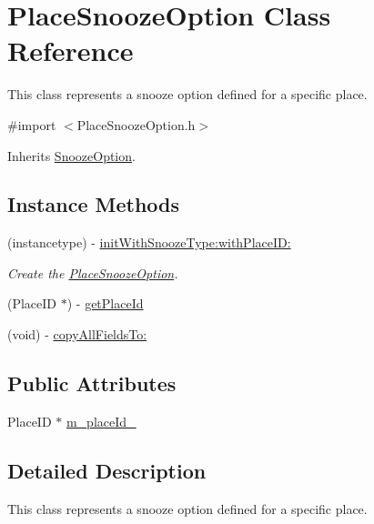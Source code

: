 \hypertarget{interface_place_snooze_option}{}\section{Place\+Snooze\+Option Class Reference}
\label{interface_place_snooze_option}


This class represents a snooze option defined for a specific place.  




{\ttfamily \#import $<$Place\+Snooze\+Option.\+h$>$}



Inherits \hyperlink{interface_snooze_option}{Snooze\+Option}.

\subsection*{Instance Methods}
\begin{DoxyCompactItemize}
\item 
(instancetype) -\/ \hyperlink{interface_place_snooze_option_a886f3a4aed9b1a687b946a1b1ada4be9}{init\+With\+Snooze\+Type\+:with\+Place\+I\+D\+:}
\begin{DoxyCompactList}\small\item\em Create the \hyperlink{interface_place_snooze_option}{Place\+Snooze\+Option}. \end{DoxyCompactList}\item 
(Place\+I\+D $\ast$) -\/ \hyperlink{interface_place_snooze_option_aed5e3332fa776919ce568ee9cafa457c}{get\+Place\+Id}
\item 
(void) -\/ \hyperlink{interface_place_snooze_option_a20d8c478510104b63f2a0870eaa862eb}{copy\+All\+Fields\+To\+:}
\end{DoxyCompactItemize}
\subsection*{Public Attributes}
\begin{DoxyCompactItemize}
\item 
Place\+I\+D $\ast$ \hyperlink{interface_place_snooze_option_ae6d8c522854e0cb8ccbe1bc67c2e261e}{m\+\_\+place\+Id\+\_\+}
\end{DoxyCompactItemize}


\subsection{Detailed Description}
This class represents a snooze option defined for a specific place. 

